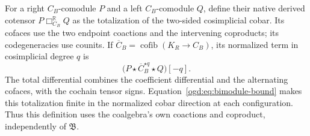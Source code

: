 For a right \(C_B\)-comodule \(P\) and a left \(C_B\)-comodule \(Q\), define their native derived cotensor \(P\mathbin{\Box}^{\mathbb R}_{C_B}Q\) as the totalization of the two-sided cosimplicial cobar.
Its cofaces use the two endpoint coactions and the intervening coproducts; its codegeneracies use counits.
If \(\overline C_B=\operatorname{cofib}(K_R\to C_B)\), its normalized term in cosimplicial degree \(q\) is
\begin{equation}\label{ogd:eq:native-cotensor}
 \bigl(P\star\overline C_B^{\star q}\star Q\bigr)[-q].
\end{equation}
The total differential combines the coefficient differential and the alternating cofaces, with the cochain tensor signs.
Equation~\eqref{ogd:eq:bimodule-bound} makes this totalization finite in the normalized cobar direction at each configuration.
Thus this definition uses the coalgebra's own coactions and coproduct, independently of \(\mathfrak B\).

